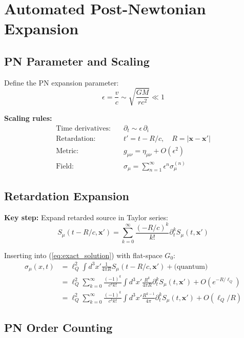 \documentclass[11pt,a4paper]{article}
\theoremstyle{definition}
\theoremstyle{remark}
\begin{document}
		\section{Automated Post-Newtonian Expansion}
		
		\subsection{PN Parameter and Scaling}
		
		Define the PN expansion parameter:
		\begin{equation}
			\epsilon = \frac{v}{c} \sim \sqrt{\frac{GM}{rc^2}} \ll 1
		\end{equation}
		
		\textbf{Scaling rules:}
		\begin{align}
			\text{Time derivatives:} &\quad \partial_t \sim \epsilon\,\partial_i\\
			\text{Retardation:} &\quad t' = t - R/c, \quad R = |\mathbf{x}-\mathbf{x}'|\\
			\text{Metric:} &\quad g_{\mu\nu} = \eta_{\mu\nu} + O(\epsilon^2)\\
			\text{Field:} &\quad \sigma_\mu = \sum_{n=1}^\infty \epsilon^n\sigma_\mu^{(n)}
		\end{align}
		
		\subsection{Retardation Expansion}
		
		\textbf{Key step:} Expand retarded source in Taylor series:
		\begin{equation}
			S_\mu(t - R/c, \mathbf{x}') = \sum_{k=0}^\infty\frac{(-R/c)^k}{k!}\partial_t^k S_\mu(t, \mathbf{x}')
		\end{equation}
		
		Inserting into (\ref{eq:exact_solution}) with flat-space $G_0$:
		\begin{align}
			\sigma_\mu(x,t) &= \ell_Q^2\int d^3x'\frac{1}{4\pi R}S_\mu(t - R/c, \mathbf{x}') + \text{(quantum)}\\
			&= \ell_Q^2\sum_{k=0}^\infty\frac{(-1)^k}{c^k k!}\int d^3x'\frac{R^k}{4\pi R}\partial_t^k S_\mu(t,\mathbf{x}') + O(e^{-R/\ell_Q})\\
			&= \ell_Q^2\sum_{k=0}^\infty\frac{(-1)^k}{c^k k!}\int d^3x'\frac{R^{k-1}}{4\pi}\partial_t^k S_\mu(t,\mathbf{x}') + O(\ell_Q/R)
		\end{align}
		
		\subsection{PN Order Counting}
		
\end{document}

